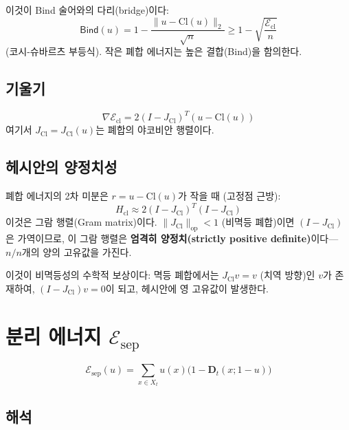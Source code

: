 이것이 Bind 술어와의 다리(bridge)이다:
\begin{equation}
    \mathsf{Bind}(u) = 1 - \frac{\|u - \mathrm{Cl}(u)\|_2}{\sqrt{n}} \geq 1 - \sqrt{\frac{\mathcal{E}_{\mathrm{cl}}}{n}}
    \label{eq:bind-energy-bridge}
\end{equation}
(코시-슈바르츠 부등식). 작은 폐합 에너지는 높은 결합(Bind)을 함의한다.

\subsection{기울기}

\begin{equation}
    \nabla \mathcal{E}_{\mathrm{cl}} = 2(I - J_{\mathrm{Cl}})^T(u - \mathrm{Cl}(u))
\end{equation}
여기서 $J_{\mathrm{Cl}} = J_{\mathrm{Cl}}(u)$는 폐합의 야코비안 행렬이다.

\subsection{헤시안의 양정치성}

폐합 에너지의 2차 미분은 $r = u - \mathrm{Cl}(u)$가 작을 때 (고정점 근방):
\begin{equation}
    H_{\mathrm{cl}} \approx 2(I - J_{\mathrm{Cl}})^T(I - J_{\mathrm{Cl}})
    \label{eq:hessian-cl}
\end{equation}
이것은 그람 행렬(Gram matrix)이다. $\|J_{\mathrm{Cl}}\|_{\mathrm{op}} < 1$ (비멱등 폐합)이면 $(I - J_{\mathrm{Cl}})$은 가역이므로, 이 그람 행렬은 \textbf{엄격히 양정치(strictly positive definite)}이다---$n/n$개의 양의 고유값을 가진다.

이것이 비멱등성의 수학적 보상이다: 멱등 폐합에서는 $J_{\mathrm{Cl}} v = v$ (치역 방향)인 $v$가 존재하여, $(I - J_{\mathrm{Cl}})v = 0$이 되고, 헤시안에 영 고유값이 발생한다.


\section{분리 에너지 $\mathcal{E}_{\mathrm{sep}}$}
\label{sec:separation-energy}

\begin{equation}
    \mathcal{E}_{\mathrm{sep}}(u) = \sum_{x \in X_t} u(x) \big( 1 - \mathbf{D}_t(x; 1-u) \big)
    \label{eq:E-sep}
\end{equation}

\subsection{해석}


